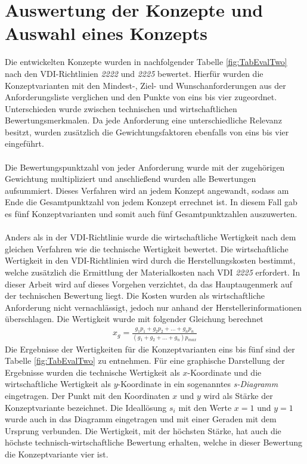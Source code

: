 \section{Auswertung der Konzepte und Auswahl eines Konzepts}
Die entwickelten Konzepte wurden in nachfolgender Tabelle \ref{fig:TabEvalTwo} nach den VDI-Richtlinien \textit{2222} und \textit{2225} bewertet. Hierf\"{u}r wurden die Konzeptvarianten mit den Mindest-, Ziel- und Wunschanforderungen aus der Anforderungsliste verglichen und den Punkte von eins bis vier zugeordnet. Unterschieden wurde zwischen technischen und wirtschaftlichen Bewertungsmerkmalen. Da jede Anforderung eine unterschiedliche Relevanz besitzt, wurden zus\"{a}tzlich die Gewichtungsfaktoren ebenfalls von eins bis vier eingef\"{u}hrt.
\\\\
Die Bewertungspunktzahl von jeder Anforderung wurde mit der zugeh\"{o}rigen Gewichtung multipliziert und anschlie{\ss}end wurden alle Bewertungen aufsummiert. Dieses Verfahren wird an jedem Konzept angewandt, sodass am Ende die Gesamtpunktzahl von jedem Konzept errechnet ist. In diesem Fall gab es f\"{u}nf Konzeptvarianten und somit auch f\"{u}nf Gesamtpunktzahlen auszuwerten.
\\\\
Anders als in der VDI-Richtlinie wurde die wirtschaftliche Wertigkeit nach dem gleichen Verfahren wie die technische Wertigkeit bewertet. Die wirtschaftliche Wertigkeit in den VDI-Richtlinien wird durch die Herstellungskosten bestimmt, welche zus\"{a}tzlich die Ermittlung der Materialkosten nach VDI \textit{2225} erfordert. In dieser Arbeit wird auf dieses Vorgehen verzichtet, da das Hauptaugenmerk auf der technischen Bewertung liegt. Die Kosten wurden als wirtschaftliche Anforderung nicht vernachl\"{a}ssigt, jedoch nur anhand der Herstellerinformationen \"{u}berschlagen. Die Wertigkeit wurde mit folgender Gleichung berechnet
\begin{align*}
	x_g = \frac{g_1p_1 + g_2p_2 + ... + g_np_n}{(g_1 + g_2 + ... + g_n)p_\textit{max}}
\end{align*}
Die Ergebnisse der Wertigkeiten f\"{u}r die Konzeptvarianten eins bis f\"{u}nf sind der Tabelle \ref{fig:TabEvalTwo} zu entnehmen. F\"{u}r eine graphische Darstellung der Ergebnisse wurden die technische Wertigkeit als \(x\)-Koordinate und die wirtschaftliche Wertigkeit als \(y\)-Koordinate in ein sogenanntes \textit{s-Diagramm} eingetragen. Der Punkt mit den Koordinaten \(x\) und \(y\) wird als St\"{a}rke der Konzeptvariante bezeichnet. Die Ideall\"{o}sung \(s_i\) mit den Werte \(x = 1\) und \(y = 1\) wurde auch in das Diagramm eingetragen und mit einer Geraden mit dem Ursprung verbunden. Die Wertigkeit, mit der h\"{o}chsten St\"{a}rke, hat auch die h\"{o}chste technisch-wirtschaftliche Bewertung erhalten, welche in dieser Bewertung die Konzeptvariante vier ist.
